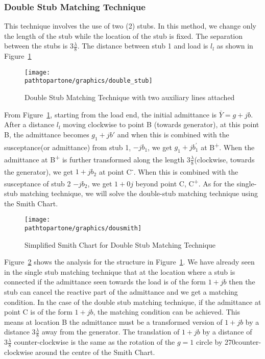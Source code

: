 \subsubsection{Double Stub Matching Technique}
This technique involves the use of two (2) stubs. In this method, we change only the length of the stub while the location of the stub is fixed. The separation between the stubs is $3\frac{\lambda}{8}$. The distance between stub 1 and load is $l_l$ as shown in Figure~\ref{fig:fig12}
\begin{figure}[h]
\centering
\texttt{[image: \\pathtopartone/graphics/double\_stub]}
\caption{Double Stub Matching Technique with two auxiliary lines attached}
\label{fig:fig12}
\end{figure}


From Figure~\ref{fig:fig12}, starting from the load end, the initial admittance is $\bar{Y} = g + jb$. After a distance $l_l$ moving clockwise to point B (towards generator), at this point B\textsuperscript{\textemdash}, the admittance becomes $g_1 + jb'$ and when this is combined with the susceptance(or admittance) from stub 1, $-jb_1$, we get $g_1 +jb_1^{'}$ at B\textsuperscript{+}. When the admittance at B\textsuperscript{+} is further transformed along the length $3\frac{\lambda}{8}$(clockwise, towards the generator), we get $1 + jb_2$ at point C\textsuperscript{-}. When this is combined with the susceptance of stub 2 $-jb_2$, we get $1 + 0j$ beyond point C, C\textsuperscript{+}. As for the single-stub matching technique, we will solve the double-stub matching technique using the Smith Chart.
\begin{figure}[h]
\centering
\texttt{[image: \\pathtopartone/graphics/dousmith]}
\caption{Simplified Smith Chart for Double Stub Matching Technique}
\label{fig:dousmith}
\end{figure}

Figure~\ref{fig:dousmith} shows the analysis for the structure in Figure~\ref{fig:fig12}. We have already seen in the single stub matching technique that at the location where a stub is connected if the admittance seen towards the load is of the form $1 +jb$ then the stub can cancel the reactive part of the admittance and we get a matching condition. In the case of the double stub matching technique, if the admittance at point C is of the form $1 + jb$, the matching condition can be achieved. This means at location B the admittance must be a transformed version of $1 + jb$ by a distance $3\frac{\lambda}{8}$ away from the generator. The translation of $1 + jb$ by a distance of $3\frac{\lambda}{8}$ counter-clockwise is the same as the rotation of the $g = 1$ circle by 270\textdegree counter-clockwise around the centre of the Smith Chart.

